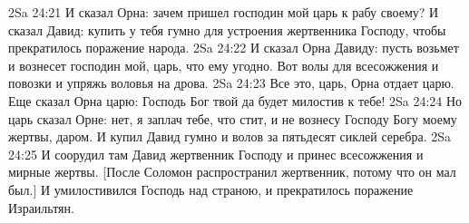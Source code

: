 \vs 2Sa 24:21 И сказал Орна: зачем пришел господин мой царь к рабу своему? И сказал Давид: купить у тебя гумно для устроения жертвенника Господу, чтобы прекратилось поражение народа.
\vs 2Sa 24:22 И сказал Орна Давиду: пусть возьмет и вознесет  господин мой, царь, что ему угодно. Вот волы для всесожжения и повозки и упряжь воловья на дрова.
\vs 2Sa 24:23 Все это, царь, Орна отдает царю. Еще сказал Орна царю: Господь Бог твой да будет милостив к тебе!
\vs 2Sa 24:24 Но царь сказал Орне: нет, я заплач тебе, что стит, и не вознесу Господу Богу моему жертвы,  даром. И купил Давид гумно и волов за пятьдесят сиклей серебра.
\vs 2Sa 24:25 И соорудил там Давид жертвенник Господу и принес всесожжения и мирные жертвы. [После Соломон распространил жертвенник, потому что он мал был.] И умилостивился Господь над страною, и прекратилось поражение Израильтян.
